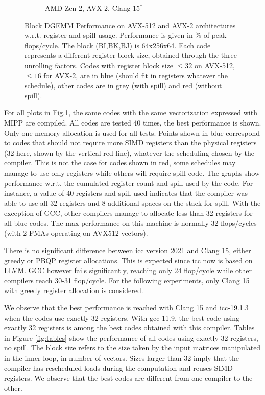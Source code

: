 \documentclass{article}
\begin{document}
\begin{figure}[h!]
\begin{subfigure}[h!]{0.45\textwidth}
  \caption{AMD Zen 2, AVX-2, Clang 15$^*$}
  \end{subfigure}
  \caption{Block DGEMM Performance on AVX-512 and AVX-2 architectures w.r.t. register and spill usage. Performance is given in \% of peak flops/cycle. The block (BI,BK,BJ) is 64x256x64. Each code represents a different register block size, obtained through the three unrolling factors. Codes with register block size $\leq 32$ on AVX-512, $\leq 16$ for AVX-2,  are in blue (should fit in registers whatever the schedule), other codes are in grey (with spill) and red (without spill).  \label{fig:cascadelake}}
\end{figure}
 For all plots in Fig.\ref{fig:cascadelake}, the same codes with the same vectorization expressed with MIPP are
compiled. All codes are tested 40 times, the best performance is shown. Only one memory allocation is used for all tests. Points shown in blue correspond to codes that should not require
more SIMD registers than the physical registers (32 here, shown by the vertical red line), whatever
the scheduling chosen by the compiler. This is not the case for codes
shown in red, some schedules may manage to use only registers while
others will require spill code. The graphs show performance w.r.t. the
cumulated register count and spill used by the code. For instance, a value of 40 registers and
spill used indicates that the compiler was able to use all 32
registers and 8 additional spaces on the stack for spill. With the exception of
GCC, other compilers manage to allocate less than 32 registers for all
blue codes. The max performance on this machine is normally 32 flops/cycles (with 2 FMAs operating on AVX512 vectors).  

There is no significant difference between icc version 2021 and Clang
15, either greedy or PBQP register allocations. This is expected since
icc now is based on LLVM. GCC however fails significantly, reaching
only 24 flop/cycle while other compilers reach 30-31 flop/cycle.  For
the following experiments, only Clang 15 with greedy register
allocation is considered.

We observe that the best performance is reached with Clang 15 and
icc-19.1.3 when the codes use exactly 32 registers. With gcc-11.9, the
best code using exactly 32 registers is among the best codes obtained
with this compiler.  Tables in Figure \ref{fig:tables} show the
performance of all codes using exactly 32 registers, no spill. The
block size refers to the size taken by the input matrices manipulated
in the inner loop, in number of vectors. Sizes larger than 32 imply that the compiler has rescheduled loads during the computation and reuses SIMD registers. We observe that the best codes are different from one compiler to the other. 
\end{document}
